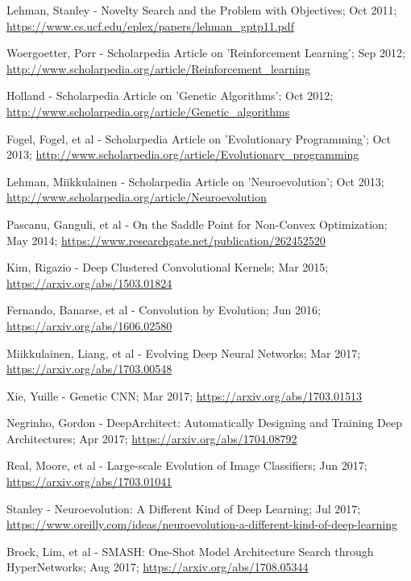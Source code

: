 \documentclass[journal, a4paper]{IEEEtran}
\begin{document}
\begin{thebibliography}{5}
    Lehman, Stanley - Novelty Search and the Problem with Objectives; Oct 2011;
    \url{https://www.cs.ucf.edu/eplex/papers/lehman_gptp11.pdf}

    Woergoetter, Porr - Scholarpedia Article on 'Reinforcement Learning'; Sep 2012;
    \url{http://www.scholarpedia.org/article/Reinforcement_learning}

    Holland - Scholarpedia Article on 'Genetic Algorithms'; Oct 2012;
    \url{http://www.scholarpedia.org/article/Genetic_algorithms}

    Fogel, Fogel, et al - Scholarpedia Article on 'Evolutionary Programming'; Oct 2013;
    \url{http://www.scholarpedia.org/article/Evolutionary_programming}

    Lehman, Miikkulainen - Scholarpedia Article on 'Neuroevolution'; Oct 2013;
    \url{http://www.scholarpedia.org/article/Neuroevolution}

    Pascanu, Ganguli, et al - On the Saddle Point for Non-Convex Optimization; May 2014;
    \url{https://www.researchgate.net/publication/262452520}

    Kim, Rigazio - Deep Clustered Convolutional Kernels; Mar 2015;
    \url{https://arxiv.org/abs/1503.01824}

    Fernando, Banarse, et al - Convolution by Evolution; Jun 2016;
    \url{https://arxiv.org/abs/1606.02580}

    Miikkulainen, Liang, et al - Evolving Deep Neural Networks; Mar 2017;
    \url{https://arxiv.org/abs/1703.00548}

    Xie, Yuille - Genetic CNN; Mar 2017;
    \url{https://arxiv.org/abs/1703.01513}

    Negrinho, Gordon - DeepArchitect: Automatically Designing and Training Deep Architectures; Apr 2017;
    \url{https://arxiv.org/abs/1704.08792}

    Real, Moore, et al - Large-scale Evolution of Image Classifiers; Jun 2017;
    \url{https://arxiv.org/abs/1703.01041}

    Stanley - Neuroevolution: A Different Kind of Deep Learning; Jul 2017;
    \url{https://www.oreilly.com/ideas/neuroevolution-a-different-kind-of-deep-learning}

    Brock, Lim, et al - SMASH: One-Shot Model Architecture Search through HyperNetworks; Aug 2017;
    \url{https://arxiv.org/abs/1708.05344}


\end{thebibliography}
\end{document}
